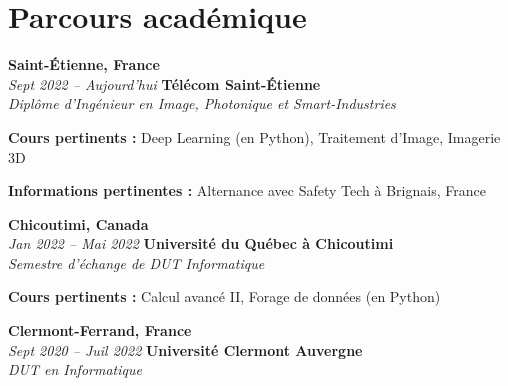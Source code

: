     
    \section{Parcours académique}
        \begin{twocolentry}{
            \textbf{Saint-Étienne, France}\\
            \textit{Sept 2022 – Aujourd'hui}
            }{
            \textbf{Télécom Saint-Étienne}\\
            \textit{Diplôme d'Ingénieur en Image, Photonique et Smart-Industries}
            }
        \end{twocolentry}


        \begin{onecolentry}
            \begin{highlights}
                \item \textbf{Cours pertinents :} Deep Learning (en Python), Traitement d'Image, Imagerie 3D
                \item \textbf{Informations pertinentes :} Alternance avec Safety Tech à Brignais, France
            \end{highlights}
        \end{onecolentry}

		\begin{twocolentry}{
			\textbf{Chicoutimi, Canada} \\
			\textit{Jan 2022 – Mai 2022}
            }{
            \textbf{Université du Québec à Chicoutimi} \\
            \textit{Semestre d'échange de DUT Informatique}
            }
        \end{twocolentry}

        \begin{onecolentry}
            \begin{highlights}
                \item \textbf{Cours pertinents :} Calcul avancé II, Forage de données (en Python)
            \end{highlights}
        \end{onecolentry}

		\begin{twocolentry}{
			\textbf{Clermont-Ferrand, France} \\
			\textit{Sept 2020 – Juil 2022}
            }{
            \textbf{Université Clermont Auvergne} \\
            \textit{DUT en Informatique}
            }
        \end{twocolentry}

